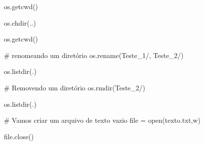 \documentclass[
  letterpaper,
  DIV=11,
  numbers=noendperiod]{scrreprt}
\newenvironment{Shaded}{\begin{snugshade}}{\end{snugshade}}
\newcommand{\NormalTok}[1]{\textcolor[rgb]{0.00,0.23,0.31}{#1}}
\begin{document}
\begin{Shaded}
\begin{Highlighting}[]
\NormalTok{os.getcwd()}
\end{Highlighting}
\end{Shaded}

\begin{Shaded}
\begin{Highlighting}[]
\NormalTok{os.chdir(\textquotesingle{}..\textquotesingle{})}
\end{Highlighting}
\end{Shaded}

\begin{Shaded}
\begin{Highlighting}[]
\NormalTok{os.getcwd()}
\end{Highlighting}
\end{Shaded}

\begin{Shaded}
\begin{Highlighting}[]
\NormalTok{\# renomeando um diretório}
\NormalTok{os.rename(\textquotesingle{}Teste\_1/\textquotesingle{}, \textquotesingle{}Teste\_2/\textquotesingle{})}
\end{Highlighting}
\end{Shaded}

\begin{Shaded}
\begin{Highlighting}[]
\NormalTok{os.listdir(\textquotesingle{}.\textquotesingle{})}
\end{Highlighting}
\end{Shaded}

\begin{Shaded}
\begin{Highlighting}[]
\NormalTok{\# Removendo um diretório}
\NormalTok{os.rmdir(\textquotesingle{}Teste\_2/\textquotesingle{})}
\end{Highlighting}
\end{Shaded}

\begin{Shaded}
\begin{Highlighting}[]
\NormalTok{os.listdir(\textquotesingle{}.\textquotesingle{})}
\end{Highlighting}
\end{Shaded}

\begin{Shaded}
\begin{Highlighting}[]
\NormalTok{\# Vamos criar um arquivo de texto vazio}
\NormalTok{file = open(\textquotesingle{}texto.txt\textquotesingle{},\textquotesingle{}w\textquotesingle{})}

\NormalTok{file.close()}
\end{Highlighting}
\end{Shaded}
\end{document}
